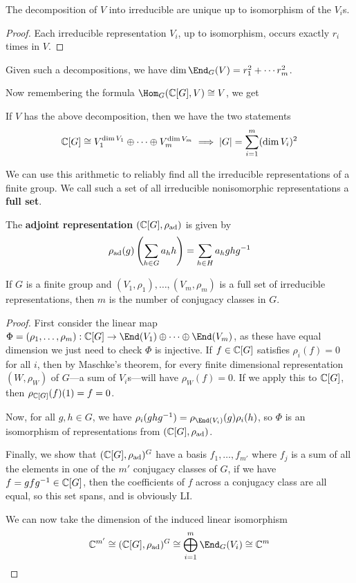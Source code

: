 \documentclass{article}
\begin{document}
\begin{corollary}
    The decomposition of $V$ into irreducible are unique up to isomorphism of the $V_i$s.\begin{proof}
        Each irreducible representation $V_i$, up to isomorphism, occurs exactly $r_i$ times in $V$.
    \end{proof}
\end{corollary}

\begin{corollary}
    Given such a decompositions, we have $\dim\End_G(V) = r_1^2 + \cdots r_m^2$.
\end{corollary}

Now remembering the formula $\Hom_G(\bC[G],V)\cong V$, we get

\begin{corollary}
    If $V$ has the above decomposition, then  we have the two statements\[
    \mathbb{C}[G] \cong V_1^{\dim V_1}\oplus \cdots \oplus V_m^{\dim V_m} \implies \left| G \right| = \sum_{i=1}^m (\dim V_i)^2
    \]
\end{corollary}

We can use this arithmetic to reliably find all the irreducible representations of a finite group. We call such a set of all irreducible nonisomorphic representations a \textbf{full set}.

\begin{definition}
    The \textbf{adjoint representation} $(\mathbb{C}[G],\rho_\text{ad})$ is given by \[
    \rho_\text{ad}(g)\left( \sum_{h\in G}a_hh \right) = \sum_{h\in H}a_h ghg^{-1}
    \]
\end{definition}

\begin{theorem}
    If $G$ is a finite group and $(V_1,\rho_1),\ldots,(V_m,\rho_m)$ is a full set of irreducible representations, then $m$ is the number of conjugacy classes in $G$.
    \begin{proof}
        First consider the linear map $\Phi = (\rho_1,\ldots,\rho_m):\bC[G]\rightarrow \End(V_1)\oplus \cdots \oplus \End(V_m)$, as these have equal dimension we just need to check $\Phi$ is injective. If $f\in \mathbb{C}[G]$ satisfies $\rho_i(f) = 0$ for all $i$, then by Maschke's theorem, for every finite dimensional representation $(W,\rho_W)$ of $G$---a sum of $V_i$s---will have $\rho_W(f)=0$. If we apply this to $\mathbb{C}[G]$, then $\rho_{\mathbb{C}[G]}(f)(1) = f = 0$.

        Now, for all $g,h\in G$, we have $\rho_i(ghg^{-1}) = \rho_{\End(V_i)}(g)\rho_i(h)$, so $\Phi$ is an isomorphism of representations from $(\mathbb{C}[G],\rho_\text{ad})$.

        Finally, we show that $(\mathbb{C}[G],\rho_\text{ad})^G$ have a basis $f_1,\ldots, f_{m'}$ where $f_j$ is a sum of all the elements in one of the $m'$ conjugacy classes of $G$, if we have $f=gfg^{-1}\in\mathbb{C}[G]$, then the coefficients of $f$ across a conjugacy class are all equal, so this set spans, and is obviously LI.

        We can now take the dimension of the induced linear isomorphism \[\bC^{m'}\cong(\bC[G],\rho_\text{ad})^G\cong \bigoplus_{i=1}^m\End_G(V_i)\cong \bC^m\qedhere\]
    \end{proof}
\end{theorem}
\end{document}
